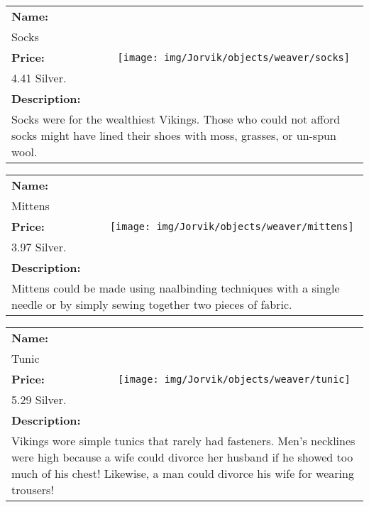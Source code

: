 \begin{table}[ht!]
	\centering
	\begin{tabular}{ p{3cm} c }\toprule
		\textbf{Name:} & \multirow{5}{*}{\texttt{[image: img/Jorvik/objects/weaver/socks]}}\\
		Socks & \\ 
		\textbf{Price:} & \\
		4.41 Silver. & \\ 
		\textbf{Description:} & \\
		\multicolumn{2}{p{12cm}}{Socks were for the wealthiest Vikings. Those who could not afford socks might have lined their shoes with moss, grasses, or un-spun wool.}\\
		\bottomrule
	\end{tabular}
\end{table}

\begin{table}[ht!]
	\centering
	\begin{tabular}{ p{3cm} c }\toprule
		\textbf{Name:} & \multirow{5}{*}{\texttt{[image: img/Jorvik/objects/weaver/mittens]}}\\
		Mittens & \\ 
		\textbf{Price:} & \\
		3.97 Silver. & \\ 
		\textbf{Description:} & \\
		\multicolumn{2}{p{12cm}}{Mittens could be made using naalbinding techniques with a single needle or by simply sewing together two pieces of fabric.}\\
		\bottomrule
	\end{tabular}
\end{table}

\begin{table}[ht!]
	\centering
	\begin{tabular}{ p{3cm} c }\toprule
		\textbf{Name:} & \multirow{5}{*}{\texttt{[image: img/Jorvik/objects/weaver/tunic]}}\\
		Tunic & \\ 
		\textbf{Price:} & \\
		5.29 Silver. & \\ 
		\textbf{Description:} & \\
		\multicolumn{2}{p{12cm}}{Vikings wore simple tunics that rarely had fasteners. Men's necklines were high because a wife could divorce her husband if he showed too much of his chest! Likewise, a man could divorce his wife for wearing trousers!}\\
		\bottomrule
	\end{tabular}
\end{table}

